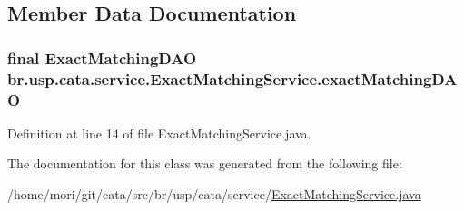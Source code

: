 \subsection{Member Data Documentation}
\hypertarget{classbr_1_1usp_1_1cata_1_1service_1_1_exact_matching_service_a355ae4d45ad5f556da749103e32ef2a0}{
\subsubsection[{exact\+Matching\+D\+A\+O}]{\setlength{\rightskip}{0pt plus 5cm}final {\bf Exact\+Matching\+D\+A\+O} br.\+usp.\+cata.\+service.\+Exact\+Matching\+Service.\+exact\+Matching\+D\+A\+O\hspace{0.3cm}{\ttfamily [private]}}}\label{classbr_1_1usp_1_1cata_1_1service_1_1_exact_matching_service_a355ae4d45ad5f556da749103e32ef2a0}


Definition at line 14 of file Exact\+Matching\+Service.\+java.



The documentation for this class was generated from the following file\+:\begin{DoxyCompactItemize}
\item 
/home/mori/git/cata/src/br/usp/cata/service/\hyperlink{_exact_matching_service_8java}{Exact\+Matching\+Service.\+java}\end{DoxyCompactItemize}
